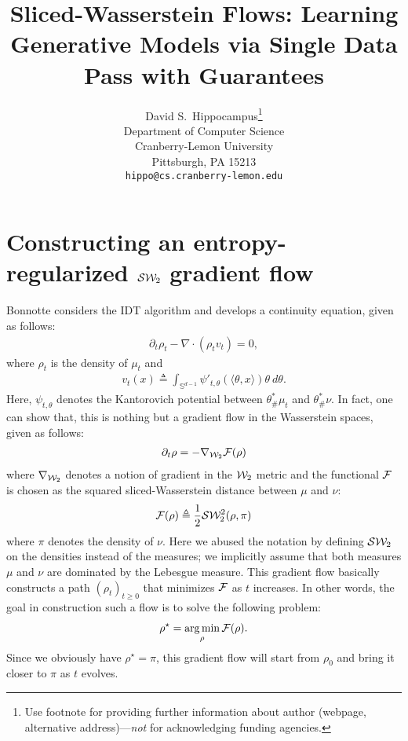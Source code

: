 \documentclass{article}
\title{Sliced-Wasserstein Flows: Learning Generative Models via Single Data Pass with Guarantees}
\author{
  David S.~Hippocampus\thanks{Use footnote for providing further
    information about author (webpage, alternative
    address)---\emph{not} for acknowledging funding agencies.} \\
  Department of Computer Science\\
  Cranberry-Lemon University\\
  Pittsburgh, PA 15213 \\
  \texttt{hippo@cs.cranberry-lemon.edu} \\
}
\newcommand{\W}{{\cal W}_2}
\newcommand{\F}{{\cal F}}
\newcommand{\SW}{{\cal S}{\cal W}_2}
\DeclareMathOperator*{\argmin}{arg\min}
\begin{document}

\maketitle

\begin{abstract}

\end{abstract}

\section{Constructing an entropy-regularized $\SW$ gradient flow}

Bonnotte \cite{bonnotte2013unidimensional} considers the IDT algorithm \cite{pitie2005n} and develops a continuity equation, given as follows:
\begin{align}
\partial_t \rho_t - \nabla \cdot (\rho_t v_t) = 0,
\end{align}
where $\rho_t$ is the density of $\mu_t$ and
\begin{align}
v_t(x) \triangleq \int_{\mathbb{S}^{d-1}} \psi'_{t,\theta}(\langle \theta, x \rangle) \theta \> d\theta. \label{eqn:idt_v}
\end{align}
Here, $\psi_{t,\theta}$ denotes the Kantorovich potential between $\theta^*_{\#}\mu_t$ and $\theta^*_{\#}\nu$. In fact, one can show that, this is nothing but a gradient flow in the Wasserstein spaces, given as follows:
\begin{align}
\partial_t \rho = - \nabla_{\W} \F(\rho) \label{eqn:gradflow}
\end{align}
where $\nabla_{\W}$ denotes a notion of gradient in the $\W$ metric and the functional $\F$ is chosen as the squared sliced-Wasserstein distance between $\mu$ and $\nu$:
\begin{align}
\F(\rho) \triangleq \frac1{2} \SW^2(\rho, \pi)
\end{align}
where $\pi$ denotes the density of $\nu$. Here we abused the notation by defining $\SW$ on the densities instead of the measures; we implicitly assume that both measures $\mu$ and $\nu$ are dominated by the Lebesgue measure. This gradient flow basically constructs a path $(\rho_t)_{t\geq 0}$ that minimizes $\F$ as $t$ increases. In other words, the goal in construction such a flow is to solve the following problem:
\begin{align}
\rho^\star = \argmin_\rho \F(\rho).
\end{align}
Since we obviously have $\rho^\star = \pi$, this gradient flow will start from $\rho_0$ and bring it closer to $\pi$ as $t$ evolves.
\end{document}
